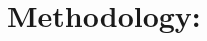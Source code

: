 \documentclass[amsmath,amssymb,nofootinbib,12pt,preprint]{revtex4}
\begin{document}
\maketitle

%

\section{ Methodology:}
\end{document}
